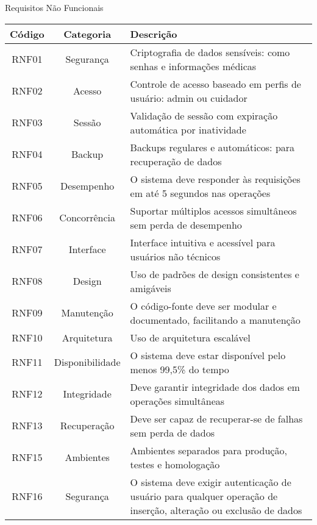 \begin{quadro}
    \caption{\label{quadro_requisitos_nf}Requisitos Não Funcionais}
    \begin{tabular}{|c|c|p{10cm}|}
        \hline
        \textbf{Código} & \textbf{Categoria} & \textbf{Descrição} \\ \hline
        RNF01  & Segurança       & Criptografia de dados sensíveis: como senhas e informações médicas \\ \hline
        RNF02  & Acesso          & Controle de acesso baseado em perfis de usuário: admin ou cuidador \\ \hline
        RNF03  & Sessão          & Validação de sessão com expiração automática por inatividade \\ \hline
        RNF04  & Backup          & Backups regulares e automáticos: para recuperação de dados \\ \hline
        RNF05  & Desempenho      & O sistema deve responder às requisições em até 5 segundos nas operações \\ \hline
        RNF06  & Concorrência    & Suportar múltiplos acessos simultâneos sem perda de desempenho \\ \hline
        RNF07  & Interface       & Interface intuitiva e acessível para usuários não técnicos \\ \hline
        RNF08  & Design          & Uso de padrões de design consistentes e amigáveis \\ \hline
        RNF09  & Manutenção      & O código-fonte deve ser modular e documentado, facilitando a manutenção \\ \hline
        RNF10  & Arquitetura     & Uso de arquitetura escalável \\ \hline
        RNF11  & Disponibilidade & O sistema deve estar disponível pelo menos 99,5\% do tempo \\ \hline
        RNF12  & Integridade     & Deve garantir integridade dos dados em operações simultâneas \\ \hline
        RNF13  & Recuperação     & Deve ser capaz de recuperar-se de falhas sem perda de dados \\ \hline
        RNF15  & Ambientes       & Ambientes separados para produção, testes e homologação \\ \hline
        RNF16  & Segurança       & O sistema deve exigir autenticação de usuário para qualquer operação de inserção, alteração ou exclusão de dados \\ \hline
    \end{tabular}
\end{quadro}
